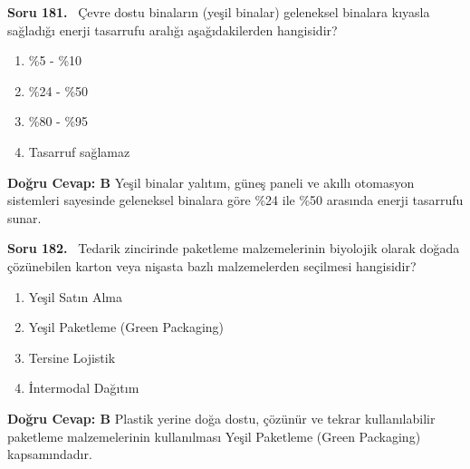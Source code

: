 \documentclass[11pt,a4paper,openany]{book}
\begin{document}
\needspace{5cm}
\vspace{8pt}
\noindent\textbf{\large\sffamily Soru 181.} \ Çevre dostu binaların (yeşil binalar) geleneksel binalara kıyasla sağladığı enerji tasarrufu aralığı aşağıdakilerden hangisidir?
\begin{enumerate}[label=\Alph*), leftmargin=25pt, topsep=4pt, itemsep=2pt]
    \item \%5 - \%10
    \item \%24 - \%50
    \item \%80 - \%95
    \item Tasarruf sağlamaz
\end{enumerate}
\vspace{4pt}
\begin{tcolorbox}[title=Cevap ve Açıklama, colback=gray!3!white, colframe=primarycolor!90!black, arc=2mm, fonttitle=\bfseries\sffamily, top=6pt, bottom=6pt]
    \textbf{Doğru Cevap: B}
    \vspace{2pt}
    Yeşil binalar yalıtım, güneş paneli ve akıllı otomasyon sistemleri sayesinde geleneksel binalara göre \%24 ile \%50 arasında enerji tasarrufu sunar.
\end{tcolorbox}
\vspace{10pt}

\needspace{5cm}
\vspace{8pt}
\noindent\textbf{\large\sffamily Soru 182.} \ Tedarik zincirinde paketleme malzemelerinin biyolojik olarak doğada çözünebilen karton veya nişasta bazlı malzemelerden seçilmesi hangisidir?
\begin{enumerate}[label=\Alph*), leftmargin=25pt, topsep=4pt, itemsep=2pt]
    \item Yeşil Satın Alma
    \item Yeşil Paketleme (Green Packaging)
    \item Tersine Lojistik
    \item İntermodal Dağıtım
\end{enumerate}
\vspace{4pt}
\begin{tcolorbox}[title=Cevap ve Açıklama, colback=gray!3!white, colframe=primarycolor!90!black, arc=2mm, fonttitle=\bfseries\sffamily, top=6pt, bottom=6pt]
    \textbf{Doğru Cevap: B}
    \vspace{2pt}
    Plastik yerine doğa dostu, çözünür ve tekrar kullanılabilir paketleme malzemelerinin kullanılması Yeşil Paketleme (Green Packaging) kapsamındadır.
\end{tcolorbox}
\vspace{10pt}
\end{document}
